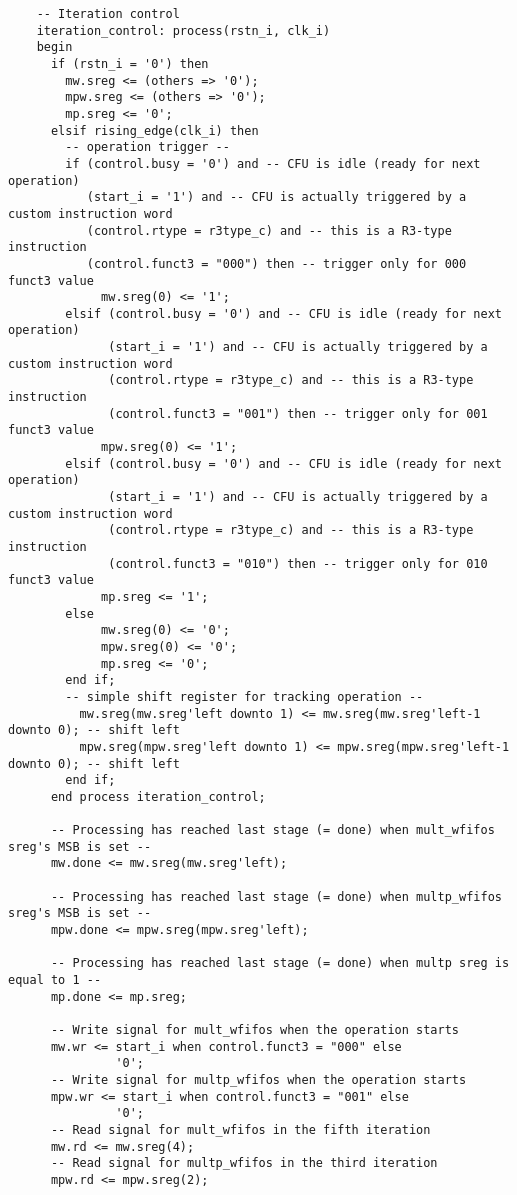 \begin{code}
\begin{verbatim}
    -- Iteration control
    iteration_control: process(rstn_i, clk_i)
    begin
      if (rstn_i = '0') then
        mw.sreg <= (others => '0');
        mpw.sreg <= (others => '0');
        mp.sreg <= '0';
      elsif rising_edge(clk_i) then
        -- operation trigger --
        if (control.busy = '0') and -- CFU is idle (ready for next operation)
           (start_i = '1') and -- CFU is actually triggered by a custom instruction word
           (control.rtype = r3type_c) and -- this is a R3-type instruction
           (control.funct3 = "000") then -- trigger only for 000 funct3 value
             mw.sreg(0) <= '1';
        elsif (control.busy = '0') and -- CFU is idle (ready for next operation)
              (start_i = '1') and -- CFU is actually triggered by a custom instruction word
              (control.rtype = r3type_c) and -- this is a R3-type instruction
              (control.funct3 = "001") then -- trigger only for 001 funct3 value
             mpw.sreg(0) <= '1';
        elsif (control.busy = '0') and -- CFU is idle (ready for next operation)
              (start_i = '1') and -- CFU is actually triggered by a custom instruction word
              (control.rtype = r3type_c) and -- this is a R3-type instruction
              (control.funct3 = "010") then -- trigger only for 010 funct3 value
             mp.sreg <= '1';
        else
             mw.sreg(0) <= '0';
             mpw.sreg(0) <= '0';
             mp.sreg <= '0';
        end if;
        -- simple shift register for tracking operation --
          mw.sreg(mw.sreg'left downto 1) <= mw.sreg(mw.sreg'left-1 downto 0); -- shift left
          mpw.sreg(mpw.sreg'left downto 1) <= mpw.sreg(mpw.sreg'left-1 downto 0); -- shift left
        end if;
      end process iteration_control;

      -- Processing has reached last stage (= done) when mult_wfifos sreg's MSB is set --
      mw.done <= mw.sreg(mw.sreg'left);

      -- Processing has reached last stage (= done) when multp_wfifos sreg's MSB is set --
      mpw.done <= mpw.sreg(mpw.sreg'left);

      -- Processing has reached last stage (= done) when multp sreg is equal to 1 --
      mp.done <= mp.sreg;

      -- Write signal for mult_wfifos when the operation starts
      mw.wr <= start_i when control.funct3 = "000" else
               '0';
      -- Write signal for multp_wfifos when the operation starts
      mpw.wr <= start_i when control.funct3 = "001" else
               '0';
      -- Read signal for mult_wfifos in the fifth iteration
      mw.rd <= mw.sreg(4);
      -- Read signal for multp_wfifos in the third iteration
      mpw.rd <= mpw.sreg(2);


\end{verbatim}
\end{code}
